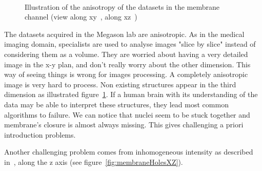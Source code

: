 \begin{figure}[htb]
  \centering
  \captionsetup[subfloat]{labelformat=empty}
  \\
\caption{%
Illustration of the anisotropy of the datasets in the membrane channel (view along xy~, along xz~)}
\label{fig:anisotropy}
\end{figure}
The datasets acquired in the Megason lab are anisotropic. As in the medical imaging domain, specialists are used to analyse images "slice by slice"
instead of considering them as a volume. They are worried about having a very detailed image in the x-y plan, and don't really worry about the other dimension.
This way of seeing things is wrong for images processing. A completely anisotropic image is very hard to process.
Non existing structures appear in the third dimension as illustrated figure~\ref{fig:anisotropy}.
If a human brain with its understanding of the data may be able to interpret these structures, they lead most common algorithms to failure.
We can notice that nuclei seem to be stuck together and membrane's closure is almost always missing. This gives challenging a priori introduction problems.

Another challenging problem comes from inhomogeneous intensity as described in~\cite{umesh2001efficient}, along the z axis (see figure~\ref{fig:membraneHolesXZ}).



